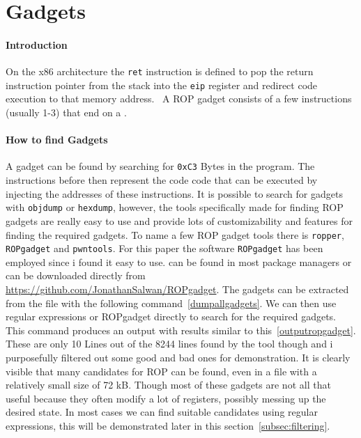 \documentclass[journal=tosc,submission, notanonymous]{iacrtrans}
\begin{document}
\section{Gadgets}
\label{sec:gadgets}
\paragraph{Introduction}
On the x86 architecture the \Verb+ret+ instruction is defined to pop the return instruction pointer from the stack into the \Verb+eip+ register and redirect code execution to that memory address.~\cite{retx86} A ROP gadget consists of a few instructions (usually 1-3) that end on a .

\paragraph{How to find Gadgets}
\label{par:ropgadget}
A gadget can be found by searching for \Verb+0xC3+ Bytes in the program. The instructions before then represent the code code that can be executed by injecting the addresses of these instructions. It is possible to search for gadgets with \Verb+objdump+ or \Verb+hexdump+, however, the tools specifically made for finding ROP gadgets are really easy to use and provide lots of customizability and features for finding the required gadgets. To name a few ROP gadget tools there is \Verb+ropper+, \Verb+ROPgadget+ and \Verb+pwntools+. For this paper the software \Verb+ROPgadget+ has been employed since i found it easy to use.  can be found in most package managers or can be downloaded directly from \url{https://github.com/JonathanSalwan/ROPgadget}. The gadgets can be extracted from the file with the following command~\cref{dumpallgadgets}. We can then use regular expressions or ROPgadget directly to search for the required gadgets.
This command produces an output with results similar to this~\cref{outputropgadget}.
These are only 10 Lines out of the 8244 lines found by the tool though and i purposefully filtered out some good and bad ones for demonstration. It is clearly visible that many candidates for ROP can be found, even in a file with a relatively small size of 72 kB. Though most of these gadgets are not all that useful because they often modify a lot of registers, possibly messing up the desired state. In most cases we can find suitable candidates using regular expressions, this will be demonstrated later in this section~\cref{subsec:filtering}.
\end{document}
